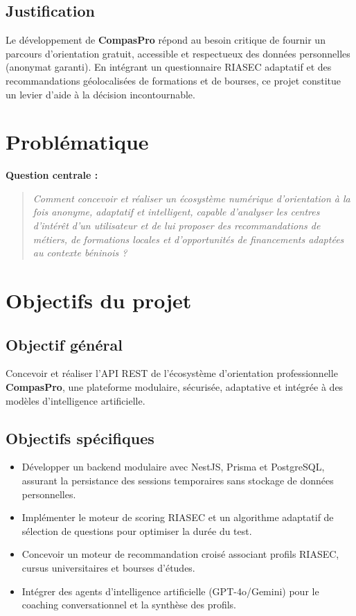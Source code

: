 \documentclass[12pt,a4paper]{report}
\begin{document}
\subsection{Justification}
Le développement de \textbf{CompasPro} répond au besoin critique de fournir un parcours d'orientation gratuit, accessible et respectueux des données personnelles (anonymat garanti). En intégrant un questionnaire RIASEC adaptatif et des recommandations géolocalisées de formations et de bourses, ce projet constitue un levier d'aide à la décision incontournable.

\section{Problématique}
\noindent
\textbf{Question centrale :}
\begin{quote}
\textit{Comment concevoir et réaliser un écosystème numérique d'orientation à la fois anonyme, adaptatif et intelligent, capable d'analyser les centres d'intérêt d'un utilisateur et de lui proposer des recommandations de métiers, de formations locales et d'opportunités de financements adaptées au contexte béninois ?}
\end{quote}

\section{Objectifs du projet}

\subsection{Objectif général}
Concevoir et réaliser l'API REST de l'écosystème d'orientation professionnelle \textbf{CompasPro}, une plateforme modulaire, sécurisée, adaptative et intégrée à des modèles d'intelligence artificielle.

\subsection{Objectifs spécifiques}
\begin{itemize}
    \item Développer un backend modulaire avec NestJS, Prisma et PostgreSQL, assurant la persistance des sessions temporaires sans stockage de données personnelles.
    \item Implémenter le moteur de scoring RIASEC et un algorithme adaptatif de sélection de questions pour optimiser la durée du test.
    \item Concevoir un moteur de recommandation croisé associant profils RIASEC, cursus universitaires et bourses d'études.
    \item Intégrer des agents d'intelligence artificielle (GPT-4o/Gemini) pour le coaching conversationnel et la synthèse des profils.
\end{itemize}
\end{document}
